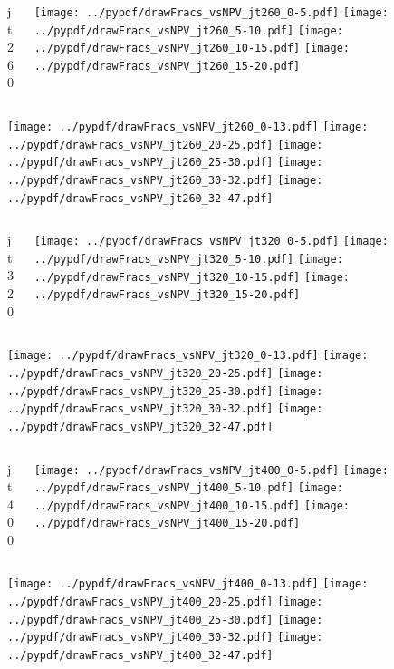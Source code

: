 \documentclass[aspectratio=169]{beamer}
\begin{document}
\begin{figure}[p]
\flushleft
\begin{columns}[T]
\begin{column}{.2\linewidth}
\centering
jt260
\end{column}
\begin{column}{.8\linewidth}
\texttt{[image: ../pypdf/drawFracs\_vsNPV\_jt260\_0-5.pdf]}
\texttt{[image: ../pypdf/drawFracs\_vsNPV\_jt260\_5-10.pdf]}
\texttt{[image: ../pypdf/drawFracs\_vsNPV\_jt260\_10-15.pdf]}
\texttt{[image: ../pypdf/drawFracs\_vsNPV\_jt260\_15-20.pdf]}
\end{column}
\end{columns}
\texttt{[image: ../pypdf/drawFracs\_vsNPV\_jt260\_0-13.pdf]}
\texttt{[image: ../pypdf/drawFracs\_vsNPV\_jt260\_20-25.pdf]}
\texttt{[image: ../pypdf/drawFracs\_vsNPV\_jt260\_25-30.pdf]}
\texttt{[image: ../pypdf/drawFracs\_vsNPV\_jt260\_30-32.pdf]}
\texttt{[image: ../pypdf/drawFracs\_vsNPV\_jt260\_32-47.pdf]}
\end{figure}

\begin{figure}[p]
\flushleft
\begin{columns}[T]
\begin{column}{.2\linewidth}
\centering
jt320
\end{column}
\begin{column}{.8\linewidth}
\texttt{[image: ../pypdf/drawFracs\_vsNPV\_jt320\_0-5.pdf]}
\texttt{[image: ../pypdf/drawFracs\_vsNPV\_jt320\_5-10.pdf]}
\texttt{[image: ../pypdf/drawFracs\_vsNPV\_jt320\_10-15.pdf]}
\texttt{[image: ../pypdf/drawFracs\_vsNPV\_jt320\_15-20.pdf]}
\end{column}
\end{columns}
\texttt{[image: ../pypdf/drawFracs\_vsNPV\_jt320\_0-13.pdf]}
\texttt{[image: ../pypdf/drawFracs\_vsNPV\_jt320\_20-25.pdf]}
\texttt{[image: ../pypdf/drawFracs\_vsNPV\_jt320\_25-30.pdf]}
\texttt{[image: ../pypdf/drawFracs\_vsNPV\_jt320\_30-32.pdf]}
\texttt{[image: ../pypdf/drawFracs\_vsNPV\_jt320\_32-47.pdf]}
\end{figure}

\begin{figure}[p]
\flushleft
\begin{columns}[T]
\begin{column}{.2\linewidth}
\centering
jt400
\end{column}
\begin{column}{.8\linewidth}
\texttt{[image: ../pypdf/drawFracs\_vsNPV\_jt400\_0-5.pdf]}
\texttt{[image: ../pypdf/drawFracs\_vsNPV\_jt400\_5-10.pdf]}
\texttt{[image: ../pypdf/drawFracs\_vsNPV\_jt400\_10-15.pdf]}
\texttt{[image: ../pypdf/drawFracs\_vsNPV\_jt400\_15-20.pdf]}
\end{column}
\end{columns}
\texttt{[image: ../pypdf/drawFracs\_vsNPV\_jt400\_0-13.pdf]}
\texttt{[image: ../pypdf/drawFracs\_vsNPV\_jt400\_20-25.pdf]}
\texttt{[image: ../pypdf/drawFracs\_vsNPV\_jt400\_25-30.pdf]}
\texttt{[image: ../pypdf/drawFracs\_vsNPV\_jt400\_30-32.pdf]}
\texttt{[image: ../pypdf/drawFracs\_vsNPV\_jt400\_32-47.pdf]}
\end{figure}
\end{document}
